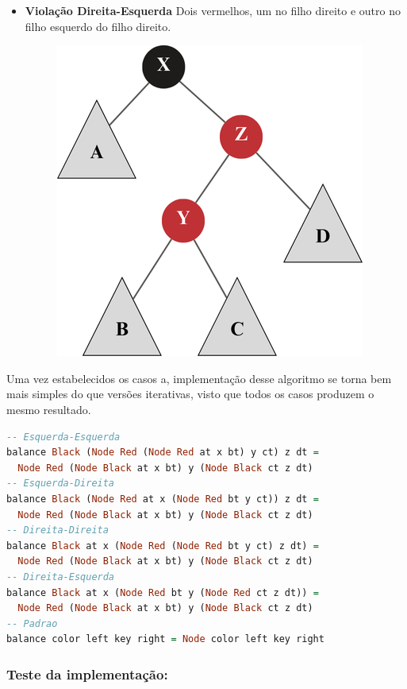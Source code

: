 \begin{itemize}
\begin{figure}[!ht]
		      \caption{}
	      \end{figure}
	      \FloatBarrier
	\item \textbf{Violação Direita-Esquerda} Dois vermelhos, um no filho direito e outro no filho esquerdo do filho direito.
	      \begin{figure}[!ht]
		      \centering
		      \includegraphics[scale=0.5]{figures/rubro-negra/right-left.png}
		      \caption{}
	      \end{figure}
	      \FloatBarrier
\end{itemize}

\noindent
Uma vez estabelecidos os casos a, implementação desse algoritmo se torna bem mais simples do que versões iterativas, visto que todos os casos produzem o mesmo resultado.

\begin{lstlisting}[language=haskell]
-- Esquerda-Esquerda
balance Black (Node Red (Node Red at x bt) y ct) z dt =
  Node Red (Node Black at x bt) y (Node Black ct z dt)
-- Esquerda-Direita
balance Black (Node Red at x (Node Red bt y ct)) z dt =
  Node Red (Node Black at x bt) y (Node Black ct z dt)
-- Direita-Direita
balance Black at x (Node Red (Node Red bt y ct) z dt) =
  Node Red (Node Black at x bt) y (Node Black ct z dt)
-- Direita-Esquerda
balance Black at x (Node Red bt y (Node Red ct z dt)) =
  Node Red (Node Black at x bt) y (Node Black ct z dt)
-- Padrao
balance color left key right = Node color left key right
\end{lstlisting}
\FloatBarrier

\subsubsection{Teste da implementação:}

